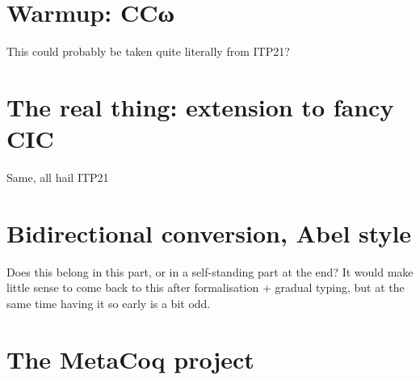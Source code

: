 \documentclass[
  french,english,
	fontsize=10pt, %
	twoside=true, %
	secnumdepth=1, %
  numbers=noenddot,
]{kaobook/kaobook}
\begin{document}



\mainmatter %










\label{part:bidir}

\chapter{Warmup: CCω}
\label{chap:bidir-ccw}

This could probably be taken quite literally from ITP21?

\chapter{The real thing: extension to fancy CIC}
\label{chap:bidir-cic}

Same, all hail ITP21

\chapter{Bidirectional conversion, Abel style}
\label{chap:bidir-conv}

Does this belong in this part, or in a self-standing part at the end?
It would make little sense to come back to this after formalisation + gradual typing,
but at the same time having it so early is a bit odd.

\label{part:metacoq}

\chapter{The MetaCoq project}
\label{chap:metacoq-general}
\end{document}
